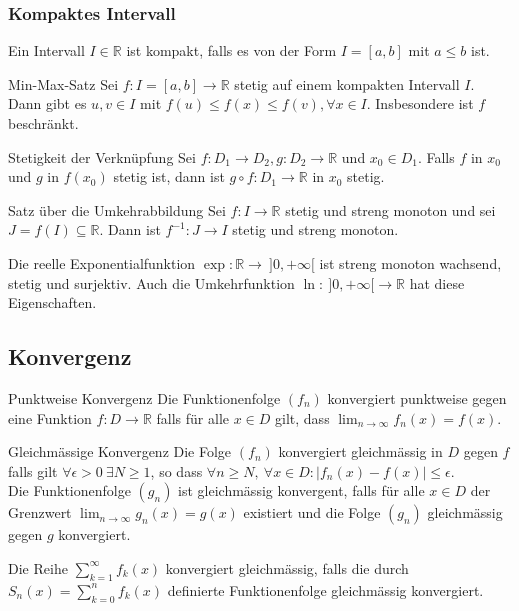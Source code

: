 \documentclass[a4paper,10pt]{article}
\def\limn{\lim_{n\to \infty}}
\def\sumk{\sum_{k=1}^\infty}
\def\R{\mathbb{R}}
\begin{document}
\subsubsection{Kompaktes Intervall}
Ein Intervall $I \in \R$ ist kompakt, falls es von der Form $I = [a,b]$ mit $a \le b$ ist.

\begin{mainbox}{Min-Max-Satz}
 Sei $f: I = [a,b] \to \R$ stetig auf einem kompakten Intervall $I$. Dann gibt es $u, v \in I$ mit $f(u) \le f(x) \le f(v), \forall x \in I$. Insbesondere ist $f$ beschränkt.
\end{mainbox}

\begin{subbox}{Stetigkeit der Verknüpfung}
 Sei $f: D_1 \to D_2, g: D_2 \to \R$ und $x_0 \in D_1$. Falls $f$ in $x_0$ und $g$ in $f(x_0)$ stetig ist, dann ist $g \circ f: D_1 \to \R$ in $x_0$ stetig.
\end{subbox}

\begin{mainbox}{Satz über die Umkehrabbildung}
 Sei $f: I \to \R$ stetig und streng monoton und sei $J = f(I) \subseteq \R$. Dann ist $f^{-1}: J \to I$ stetig und streng monoton.
\end{mainbox}

\begin{subbox}{Die reelle Exponentialfunktion}
 $\exp: \R \to \ ]0,+\infty[$ ist streng monoton wachsend, stetig und surjektiv. Auch die Umkehrfunktion $\ln: \ ]0,+\infty[ \to \R$ hat diese Eigenschaften.
\end{subbox}

\subsection{Konvergenz}

\begin{mainbox}{Punktweise Konvergenz}
  Die Funktionenfolge $(f_n)$ konvergiert punktweise gegen eine Funktion $f: D \to \R$ falls für alle $x \in D$ gilt, dass $\limn f_n(x) = f(x)$.
\end{mainbox}

\begin{mainbox}{Gleichmässige Konvergenz}
 Die Folge $(f_n)$ konvergiert gleichmässig in $D$ gegen $f$ falls gilt $\forall \epsilon > 0 \ \exists N \ge 1$, so dass $\forall n \ge N, \ \forall x \in D: | f_n(x) - f(x) | \le \epsilon$. \\
 Die Funktionenfolge $(g_n)$ ist gleichmässig konvergent, falls für alle $x\in D$ der Grenzwert $\limn g_n(x) = g(x)$ existiert und die Folge $(g_n)$ gleichmässig gegen $g$ konvergiert.
\end{mainbox}
Die Reihe $\sumk f_k(x)$ konvergiert gleichmässig, falls die durch $S_n(x) = \sum_{k=0}^n f_k(x)$ definierte Funktionenfolge gleichmässig konvergiert.
\end{document}
